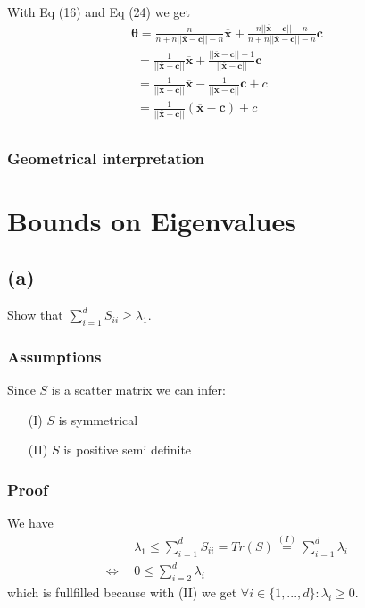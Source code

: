 \documentclass{article}
\begin{document}
With Eq (16) and Eq (24) we get
\begin{align*}
&\boldsymbol{\theta}= \frac{n}{n + n ||\boldsymbol{\overline{x}} - \boldsymbol{c} || - n }\boldsymbol{\overline{x}} + \frac{n ||\boldsymbol{\overline{x}} - \boldsymbol{c} || - n}{n + n ||\boldsymbol{\overline{x}} - \boldsymbol{c} || - n}  \boldsymbol{c}&&\\
&~~= \frac{1}{||\boldsymbol{\overline{x}} - \boldsymbol{c} ||}\boldsymbol{\overline{x}} + \frac{||\boldsymbol{\overline{x}} - \boldsymbol{c} || - 1}{||\boldsymbol{\overline{x}} - \boldsymbol{c} ||}  \boldsymbol{c}&&\\
&~~= \frac{1}{||\boldsymbol{\overline{x}} - \boldsymbol{c} ||}\boldsymbol{\overline{x}}  - \frac{1}{||\boldsymbol{\overline{x}} - \boldsymbol{c} ||}  \boldsymbol{c} + c&&\\
&~~= \frac{1}{||\boldsymbol{\overline{x}} - \boldsymbol{c} ||}(\boldsymbol{\overline{x}}  - \boldsymbol{c}) + c&&\\
\end{align*}
\subsubsection*{Geometrical interpretation}


\section{Bounds on Eigenvalues }
\subsection*{(a)}
Show that $\sum \limits _{i=1}^d S_{ii} \geq \lambda_1$.
\subsubsection*{Assumptions}
Since $S$ is a scatter matrix we can infer:
\begin{itemize}
	\item[(I)] $S$ is symmetrical 
	\item[(II)] $S$ is positive semi definite
\end{itemize}
\subsubsection*{Proof}
We have
\begin{align*}
&\lambda_1 \leq \sum \limits _{i=1}^d S_{ii} = Tr(S) \stackrel{(I)}{=}
\sum \limits _{i=1}^d \lambda_i& \\
\Leftrightarrow~~& 0 \leq  \sum \limits _{i=2}^d \lambda_i&
\end{align*}
which is fullfilled because with (II) we get $\forall i \in \{1,...,d\} : \lambda_i \geq 0$.
\end{document}
